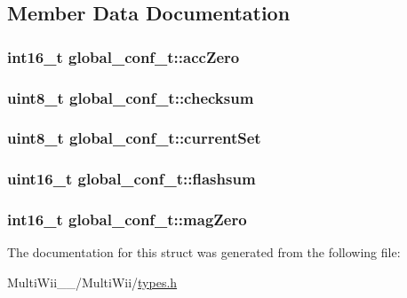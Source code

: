 \subsection{Member Data Documentation}
\hypertarget{structglobal__conf__t_abb838b060d217283eb6c1a722eb0a239}{
\subsubsection[{acc\-Zero}]{\setlength{\rightskip}{0pt plus 5cm}int16\-\_\-t global\-\_\-conf\-\_\-t\-::acc\-Zero}}\label{structglobal__conf__t_abb838b060d217283eb6c1a722eb0a239}
\hypertarget{structglobal__conf__t_a1cc054737dfa05625197ca539b112f6f}{
\subsubsection[{checksum}]{\setlength{\rightskip}{0pt plus 5cm}uint8\-\_\-t global\-\_\-conf\-\_\-t\-::checksum}}\label{structglobal__conf__t_a1cc054737dfa05625197ca539b112f6f}
\hypertarget{structglobal__conf__t_ac46db6f8408cc97788e37669d8c7ae94}{
\subsubsection[{current\-Set}]{\setlength{\rightskip}{0pt plus 5cm}uint8\-\_\-t global\-\_\-conf\-\_\-t\-::current\-Set}}\label{structglobal__conf__t_ac46db6f8408cc97788e37669d8c7ae94}
\hypertarget{structglobal__conf__t_a1d3fb9a6a90e8c3991e12d4e657c144c}{
\subsubsection[{flashsum}]{\setlength{\rightskip}{0pt plus 5cm}uint16\-\_\-t global\-\_\-conf\-\_\-t\-::flashsum}}\label{structglobal__conf__t_a1d3fb9a6a90e8c3991e12d4e657c144c}
\hypertarget{structglobal__conf__t_a5867dd42f729dd56b83914f38192a627}{
\subsubsection[{mag\-Zero}]{\setlength{\rightskip}{0pt plus 5cm}int16\-\_\-t global\-\_\-conf\-\_\-t\-::mag\-Zero}}\label{structglobal__conf__t_a5867dd42f729dd56b83914f38192a627}


The documentation for this struct was generated from the following file\-:\begin{DoxyCompactItemize}
\item 
Multi\-Wii\-\_\-\_/\-Multi\-Wii/\hyperlink{MultiWii__2__4_2MultiWii_2types_8h}{types.\-h}\end{DoxyCompactItemize}
